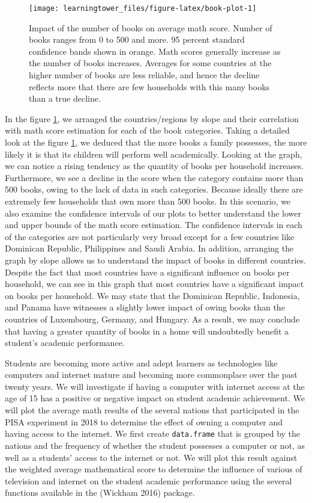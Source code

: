 \begin{figure}[H]
\texttt{[image: learningtower\_files/figure-latex/book-plot-1]} \caption{Impact of the number of books on average math score. Number of books ranges from 0 to 500 and more. 95 percent standard confidence bands shown in orange. Math scores generally increase as the number of books increases. Averages for some countries at the higher number of books are less reliable, and hence the decline reflects more that there are few households with this many books than a true decline.}\label{fig:book-plot}
\end{figure}

In the figure \ref{fig:book-plot}, we arranged the countries/regions by slope and their correlation with math score estimation for each of the book categories. Taking a detailed look at the figure \ref{fig:book-plot}, we deduced that the more books a family possesses, the more likely it is that its children will perform well academically. Looking at the graph, we can notice a rising tendency as the quantity of books per household increases. Furthermore, we see a decline in the score when the category contains more than 500 books, owing to the lack of data in such categories. Because ideally there are extremely few households that own more than 500 books. In this scenario, we also examine the confidence intervals of our plots to better understand the lower and upper bounds of the math score estimation. The confidence intervals in each of the categories are not particularly very broad except for a few countries like Dominican Republic, Philippines and Saudi Arabia. In addition, arranging the graph by slope allows us to understand the impact of books in different countries. Despite the fact that most countries have a significant influence on books per household, we can see in this graph that most countries have a significant impact on books per household. We may state that the Dominican Republic, Indonesia, and Panama have witnesses a slightly lower impact of owing books than the countries of Luxembourg, Germany, and Hungary. As a result, we may conclude that having a greater quantity of books in a home will undoubtedly benefit a student's academic performance.

Students are becoming more active and adept learners as technologies like computers and internet mature and becoming more commonplace over the past twenty years. We will investigate if having a computer with internet access at the age of 15 has a positive or negative impact on student academic achievement. We will plot the average math results of the several nations that participated in the PISA experiment in 2018 to determine the effect of owning a computer and having access to the internet. We first create \texttt{data.frame} that is grouped by the nations and the frequency of whether the student possesses a computer or not, as well as a students' access to the internet or not. We will plot this result against the weighted average mathematical score to determine the influence of various of television and internet on the student academic performance using the several functions available in the  (Wickham 2016) package.

